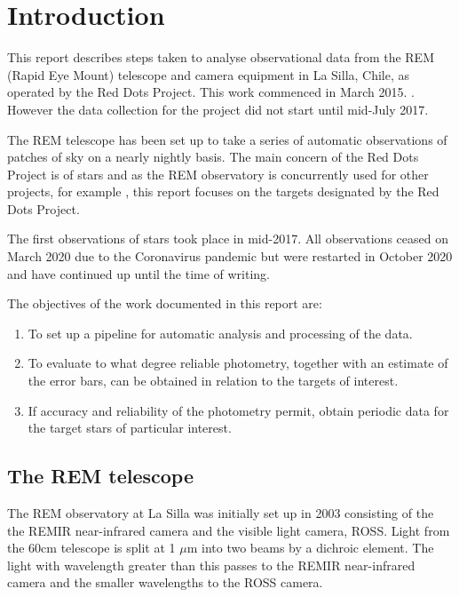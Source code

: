 \section{Introduction}
\protect\label{section:intro}

\engdate

This report describes steps taken to analyse observational data from the
REM (Rapid Eye Mount) telescope and camera equipment in La Silla, Chile, as
operated by the Red Dots Project. This work commenced in March 2015.
\citep{reddotsspace20}. However the data collection for the project did not
start until mid-July 2017.

The REM telescope has been set up to take a series of automatic
observations of patches of sky on a nearly nightly basis. The main concern of
the Red Dots Project is of {\rdwarf} stars and as the REM observatory is
concurrently used for other projects, for example \citet{giannini18}, this
report focuses on the {\rdwarf} targets designated by the Red Dots Project.

The first observations of {\rdwarf} stars took place in mid-2017. All
observations ceased on March 2020 due to the Coronavirus pandemic but were
restarted in October 2020 and have continued up until the time of writing.

The objectives of the work documented in this report are:
\begin{enumerate}
  \item To set up a pipeline for automatic analysis and processing of the data.
  \item To evaluate to what degree reliable photometry, together with an
  estimate of the error bars, can be obtained in relation to the targets of
  interest.
  \item If accuracy and reliability of the photometry permit, obtain periodic
  data for the target stars of particular interest.
\end{enumerate}

\subsection{The REM telescope}
\protect\label{section:remscope}

The REM observatory at La Silla was initially set up in 2003
\citep{antonelli05} consisting of the the REMIR near-infrared camera and the
visible light camera, ROSS. Light from the 60cm telescope is split at 1 $\mu$m into two beams
by a dichroic element. The light with wavelength greater than this passes to the
REMIR near-infrared camera and the smaller wavelengths to the ROSS camera.

